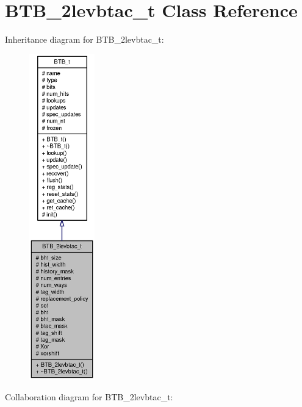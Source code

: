 \section{BTB\_\-2levbtac\_\-t Class Reference}
\label{classBTB__2levbtac__t}
Inheritance diagram for BTB\_\-2levbtac\_\-t:\nopagebreak
\begin{figure}[H]
\begin{center}
\leavevmode
\includegraphics[height=400pt]{classBTB__2levbtac__t__inherit__graph}
\end{center}
\end{figure}
Collaboration diagram for BTB\_\-2levbtac\_\-t:\nopagebreak
